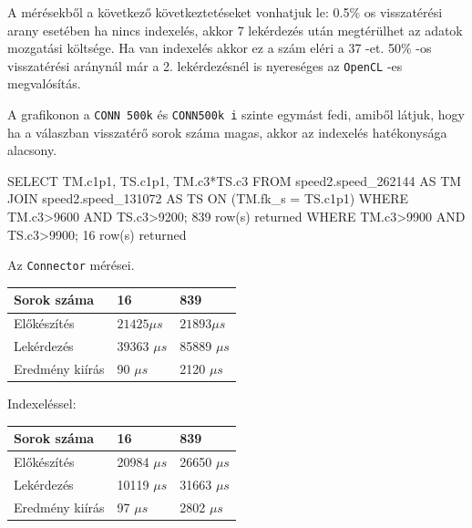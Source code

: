 A mérésekből a következő következtetéseket vonhatjuk le:
0.5\% os visszatérési arany esetében ha nincs indexelés, akkor 7 lekérdezés után megtérülhet az adatok mozgatási költsége.
Ha van indexelés akkor ez a szám eléri a 37 -et.
50\% -os visszatérési aránynál már a 2. lekérdezésnél is nyereséges az \texttt{OpenCL} -es megvalósítás. 

A grafikonon a \texttt{CONN 500k} és \texttt{CONN500k i} szinte egymást fedi, amiből látjuk, hogy ha a válaszban visszatérő sorok száma magas, akkor az indexelés hatékonysága alacsony.


\newpage
{}

\begin{python}
SELECT TM.c1p1, TS.c1p1, TM.c3*TS.c3 FROM speed2.speed_262144 AS TM 
JOIN speed2.speed_131072 AS TS ON (TM.fk_s = TS.c1p1) 
WHERE TM.c3>9600 AND TS.c3>9200; 
	839 row(s) returned
WHERE TM.c3>9900 AND TS.c3>9900; 
	16 row(s) returned
\end{python}

Az \texttt{Connector} mérései.

\begin{table}[h!]
\centering
\begin{tabular}{|p{6cm}|p{3cm}|p{3cm}|}
\hline
Sorok száma & 16 & 839 \\
\hline\hline

Előkészítés & $21425 \mu s$ & $21893 \mu s$ \\
\hline

Lekérdezés & 39363 $\mu s$ & 85889 $\mu s$ \\
\hline

Eredmény kiírás & 90 $\mu s$ & 2120 $\mu s$ \\
\hline

\end{tabular}
\end{table}

Indexeléssel:
\begin{table}[h!]
\centering
\begin{tabular}{|p{6cm}|p{3cm}|p{3cm}|}
\hline
Sorok száma & 16 & 839 \\
\hline
\hline

Előkészítés & 20984 $\mu s$ & 26650 $\mu s$ \\
\hline

Lekérdezés & 10119 $\mu s$ & 31663 $\mu s$ \\
\hline

Eredmény kiírás & 97 $\mu s$ & 2802 $\mu s$ \\
\hline

\end{tabular}
\end{table}

